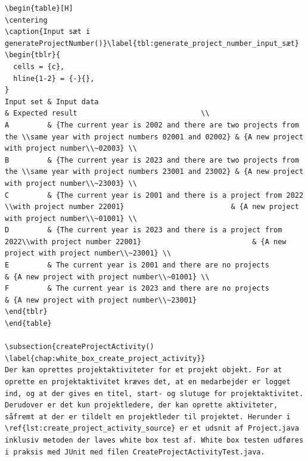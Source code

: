 \begin{listing}[H]
\begin{verbatim}
\begin{table}[H]
\centering
\caption{Input sæt i generateProjectNumber()}\label{tbl:generate_project_number_input_sæt}
\begin{tblr}{
  cells = {c},
  hline{1-2} = {-}{},
}
Input set & Input data                                                                                                      & Expected result                             \\
A         & {The current year is 2002 and there are two projects from the \\same year with project numbers 02001 and 02002} & {A new project with project number\\~02003} \\
B         & {The current year is 2023 and there are two projects from the \\same year with project numbers 23001 and 23002} & {A new project with project number\\~23003} \\
C         & {The current year is 2001 and there is a project from 2022 \\with project number 22001}                         & {A new project with project number\\~01001} \\
D         & {The current year is 2023 and there is a project from 2022\\with project number 22001}                          & {A new project with project number\\~23001} \\
E         & The current year is 2001 and there are no projects                                                              & {A new project with project number\\~01001} \\
F         & The current year is 2023 and there are no projects                                                              & {A new project with project number\\~23001} 
\end{tblr}
\end{table}

\subsection{createProjectActivity() \label{chap:white_box_create_project_activity}} 
Der kan oprettes projektaktiviteter for et projekt objekt. For at oprette en projektaktivitet kræves det, at en medarbejder er logget ind, og at der gives en titel, start- og slutuge for projektaktivitet. Derudover er det kun projektledere, der kan oprette aktiviteter, såfremt at der er tildelt en projektleder til projektet. Herunder i \ref{lst:create_project_activity_source} er et udsnit af Project.java inklusiv metoden der laves white box test af. White box testen udføres i praksis med JUnit med filen CreateProjectActivityTest.java.



\end{verbatim}
\end{listing}
